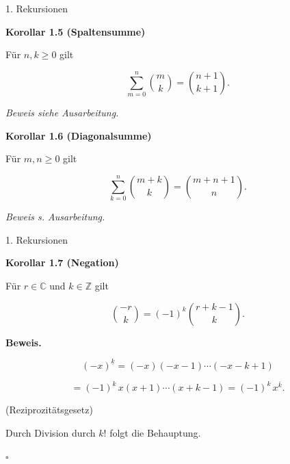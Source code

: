 \documentclass{beamer}
\begin{document}
\begin{frame}{1. Rekursionen}

\textbf{Korollar 1.5 (Spaltensumme)}

\vspace{0.3cm}

Für \(n,k\ge 0\) gilt

\[
\sum_{m=0}^{n}\binom{m}{k}
=
\binom{n+1}{k+1}.
\]

\vspace{0.2cm}

\textit{Beweis siehe Ausarbeitung.}

\vspace{0.5cm}

\textbf{Korollar 1.6 (Diagonalsumme)}

\vspace{0.3cm}

Für \(m,n\ge 0\) gilt

\[
\sum_{k=0}^{n}\binom{m+k}{k}
=
\binom{m+n+1}{n}.
\]

\vspace{0.2cm}

\textit{Beweis s. Ausarbeitung.}

\end{frame}

\begin{frame}{1. Rekursionen}

\textbf{Korollar 1.7 (Negation)}

\vspace{0.3cm}

Für \(r\in\mathbb C\) und \(k\in\mathbb Z\) gilt

\[
\binom{-r}{k}
=
(-1)^k
\binom{r+k-1}{k}.
\]

\vspace{0.4cm}

\textbf{Beweis.}

\[
(-x)^{\underline{k}}
=
(-x)(-x-1)\cdots(-x-k+1)
\]

\[
=
(-1)^k\,x(x+1)\cdots(x+k-1)
=
(-1)^k\,x^{\overline{k}}.
\]

(Reziprozitätsgesetz)

\vspace{0.2cm}

Durch Division durch \(k!\) folgt die Behauptung.

\hfill\(\square\)

\end{frame}
\end{document}
